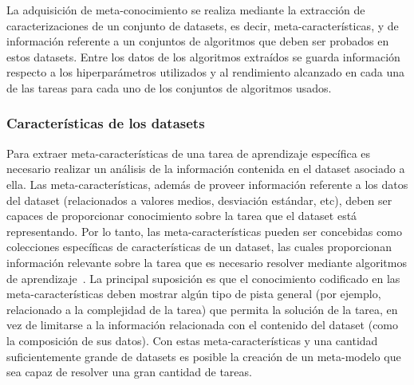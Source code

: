 
La adquisición de meta-conocimiento se realiza mediante la extracción de caracterizaciones de un conjunto de datasets, es decir, meta-características, y de información referente a un conjuntos de algoritmos que deben ser probados en estos datasets. Entre los datos de los algoritmos extraídos se guarda información respecto a los hiperparámetros utilizados y al rendimiento alcanzado en cada una de las tareas para cada uno de los conjuntos de algoritmos usados.

\subsubsection{Características de los datasets}\label{subsub:metafeat}

Para extraer meta-características de una tarea de aprendizaje específica es necesario realizar un análisis de la información contenida en el dataset asociado a ella. Las meta-características, además de proveer información referente a los datos del dataset (relacionados a valores medios, desviación estándar, etc), deben ser capaces de proporcionar conocimiento sobre la tarea que el dataset está representando.  Por lo tanto, las meta-características pueden ser concebidas como colecciones específicas de características de un dataset, las cuales proporcionan información relevante sobre la tarea que es necesario resolver mediante algoritmos de aprendizaje~\cite{castiello2005metadata}. La principal suposición es que el conocimiento codificado en las meta-características deben mostrar algún tipo de pista general (por ejemplo, relacionado a la complejidad de la tarea) que permita la solución de la tarea, en vez de limitarse a la información relacionada con el contenido del dataset (como la composición de sus datos). Con estas meta-características y una cantidad suficientemente grande de datasets es posible la creación de un meta-modelo que sea capaz de resolver una gran cantidad de tareas.

